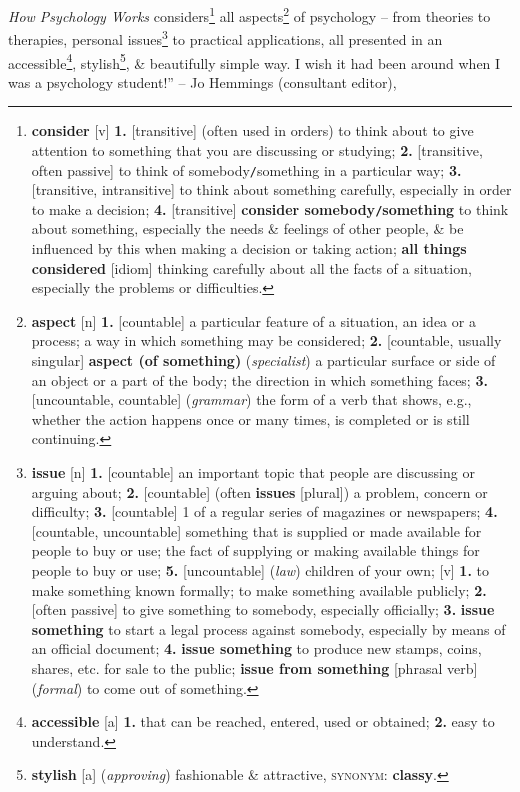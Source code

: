 \documentclass[oneside]{book}
\numberwithin{equation}{section}
\begin{document}
\textit{How Psychology Works} considers\footnote{\textbf{consider} [v] \textbf{1.} [transitive] (often used in orders) to think about to give attention to something that you are discussing or studying; \textbf{2.} [transitive, often passive] to think of somebody\texttt{/}something in a particular way; \textbf{3.} [transitive, intransitive] to think about something carefully, especially in order to make a decision; \textbf{4.} [transitive] \textbf{consider somebody\texttt{/}something} to think about something, especially the needs \& feelings of other people, \& be influenced by this when making a decision or taking action; \textbf{all things considered} [idiom] thinking carefully about all the facts of a situation, especially the problems or difficulties.} all aspects\footnote{\textbf{aspect} [n] \textbf{1.} [countable] a particular feature of a situation, an idea or a process; a way in which something may be considered; \textbf{2.} [countable, usually singular] \textbf{aspect (of something)} (\textit{specialist}) a particular surface or side of an object or a part of the body; the direction in which something faces; \textbf{3.} [uncountable, countable] (\textit{grammar}) the form of a verb that shows, e.g., whether the action happens once or many times, is completed or is still continuing.} of psychology -- from theories to therapies, personal issues\footnote{\textbf{issue} [n] \textbf{1.} [countable] an important topic that people are discussing or arguing about; \textbf{2.} [countable] (often \textbf{issues} [plural]) a problem, concern or difficulty; \textbf{3.} [countable] 1 of a regular series of magazines or newspapers; \textbf{4.} [countable, uncountable] something that is supplied or made available for people to buy or use; the fact of supplying or making available things for people to buy or use; \textbf{5.} [uncountable] (\textit{law}) children of your own; [v] \textbf{1.} to make something known formally; to make something available publicly; \textbf{2.} [often passive] to give something to somebody, especially officially; \textbf{3.} \textbf{issue something} to start a legal process against somebody, especially by means of an official document; \textbf{4.} \textbf{issue something} to produce new stamps, coins, shares, etc. for sale to the public; \textbf{issue from something} [phrasal verb] (\textit{formal}) to come out of something.} to practical applications, all presented in an accessible\footnote{\textbf{accessible} [a] \textbf{1.} that can be reached, entered, used or obtained; \textbf{2.} easy to understand.}, stylish\footnote{\textbf{stylish} [a] (\textit{approving}) fashionable \& attractive, \textsc{synonym}: \textbf{classy}.}, \& beautifully simple way. I wish it had been around when I was a psychology student!'' -- Jo Hemmings (consultant editor), \cite[Foreword, p. 9]{DK2018}
\end{document}
